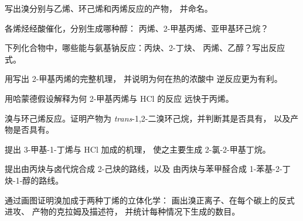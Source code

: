 \begin{exercise}[$\star$]\label{exo:b1:electrophilic-additions:2}
写出溴分别与乙烯、环己烯和丙烯反应的产物，
并命名。
\end{exercise}

\begin{exercise}[$\star$]\label{exo:b1:electrophilic-additions:3}
各烯烃经酸催化，分别生成哪种醇：
丙烯、2-甲基丙烯、亚甲基环己烷？
\end{exercise}

\begin{exercise}[$\star$]\label{exo:b1:electrophilic-additions:4}
下列化合物中，哪些能与氨基钠反应：丙炔、2-丁炔、
丙烯、乙醇？写出反应式。
\end{exercise}

\begin{exercise}[$\star\star$]\label{exo:b1:electrophilic-additions:5}
用写出 2-甲基丙烯的完整机理，
并说明为何在热的浓酸中
逆反应更为有利。
\end{exercise}

\begin{exercise}[$\star\star$]\label{exo:b1:electrophilic-additions:6}
用哈蒙德假设解释为何 2-甲基丙烯与 HCl 的反应
远快于丙烯。
\end{exercise}

\begin{exercise}[$\star\star$]\label{exo:b1:electrophilic-additions:7}
溴与环己烯反应。证明产物为
\textit{trans}-1,2-二溴环己烷，并判断其是否具有，
以及产物是否具有。
\end{exercise}

\begin{exercise}[$\star\star$]\label{exo:b1:electrophilic-additions:8}
提出 3-甲基-1-丁烯与 HCl 加成的机理，
使之主要生成 2-氯-2-甲基丁烷。
\end{exercise}

\begin{exercise}[$\star\star$]\label{exo:b1:electrophilic-additions:9}
提出由丙炔与卤代烷合成 2-己炔的路线，以及
由丙炔与苯甲醛合成 1-苯基-2-丁炔-1-醇的路线。
\end{exercise}

\begin{exercise}[$\star\star\star$]\label{exo:b1:electrophilic-additions:10}
通过画图证明溴加成于两种丁烯的立体化学：
画出溴正离子、在每个碳上的反式进攻、
产物的克拉姆及描述符，
并统计每种情况下生成的数目。
\end{exercise}

